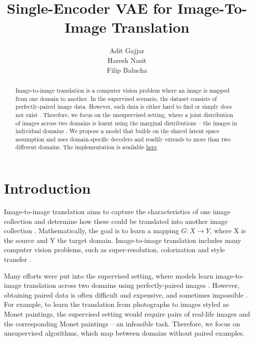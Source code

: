 \documentclass{article}
\title{Single-Encoder VAE for Image-To-Image Translation}
\author{%
  Adit Gajjar
  \\
  \And
  Haresh Nasit \\
  \And
  Filip Balucha \\
}
\begin{document}
\maketitle

\begin{abstract}
  Image-to-image translation is a computer vision problem where an image is mapped from one domain to another. In the supervised scenario, the dataset consists of perfectly-paired image data. However, such data is either hard to find or simply does not exist \citep{zhu}. Therefore, we focus on the unsupervised setting, where a joint distribution of images across two domains is learnt using the marginal distributions – the images in individual domains \citep{liu}. We propose a model that builds on the shared latent space assumption and uses domain-specific decoders and readily extends to more than two different domains. The implementation is available \href{https://github.com/HareshNasit/CSC413-Project}{here}.
\end{abstract}
\section{Introduction}
Image-to-image translation aims to capture the characteristics of one image collection and determine how these could be translated into another image collection \citep{zhu}. Mathematically, the goal is to learn a mapping $G: X \rightarrow Y$, where X is the source and Y the target domain. Image-to-image translation includes many computer vision problems, such as super-resolution, colorization and style transfer \citep{liu}. 

Many efforts were put into the supervised setting, where models learn image-to-image translation across two domains using perfectly-paired images \citep{zhu}. However, obtaining paired data is often difficult and expensive, and sometimes impossible \citep{zhu}. For example, to learn the translation from photographs to images styled as Monet paintings, the supervised setting would require pairs of real-life images and the corresponding Monet paintings – an infeasible task. Therefore, we focus on unsupervised algorithms, which map between domains without paired examples.
\end{document}
